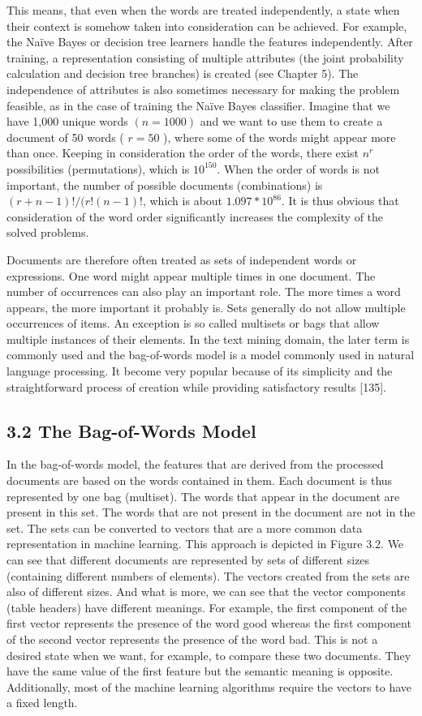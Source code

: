 \documentclass[10pt]{book}
\begin{document}
This means, that even when the words are treated independently, a state when their context is somehow taken into consideration can be achieved. For example, the Naïve Bayes or decision tree learners handle the features independently. After training, a representation consisting of multiple attributes (the joint probability calculation and decision tree branches) is created (see Chapter 5). The independence of attributes is also sometimes necessary for making the problem feasible, as in the case of training the Naïve Bayes classifier. Imagine that we have 1,000 unique words $(n=1000)$ and we want to use them to create a document of 50 words ( $r=50$ ), where some of the words might appear more than once. Keeping in consideration the order of the words, there exist $n^{r}$ possibilities (permutations), which is $10^{150}$. When the order of words is not important, the number of possible documents (combinations) is $(r+n-1)!/(r!(n-1)!$, which is about $1.097 * 10^{86}$. It is thus obvious that consideration of the word order significantly increases the complexity of the solved problems.

Documents are therefore often treated as sets of independent words or expressions. One word might appear multiple times in one document. The number of occurrences can also play an important role. The more times a word appears, the more important it probably is. Sets generally do not allow multiple occurrences of items. An exception is so called multisets or bags that allow multiple instances of their elements. In the text mining domain, the later term is commonly used and the bag-of-words model is a model commonly used in natural language processing. It become very popular because of its simplicity and the straightforward process of creation while providing satisfactory results [135].

\subsection*{3.2 The Bag-of-Words Model}
In the bag-of-words model, the features that are derived from the processed documents are based on the words contained in them. Each document is thus represented by one bag (multiset). The words that appear in the document are present in this set. The words that are not present in the document are not in the set. The sets can be converted to vectors that are a more common data representation in machine learning. This approach is depicted in Figure 3.2. We can see that different documents are represented by sets of different sizes (containing different numbers of elements). The vectors created from the sets are also of different sizes. And what is more, we can see that the vector components (table headers) have different meanings. For example, the first component of the first vector represents the presence of the word good whereas the first component of the second vector represents the presence of the word bad. This is not a desired state when we want, for example, to compare these two documents. They have the same value of the first feature but the semantic meaning is opposite. Additionally, most of the machine learning algorithms require the vectors to have a fixed length.
\end{document}
